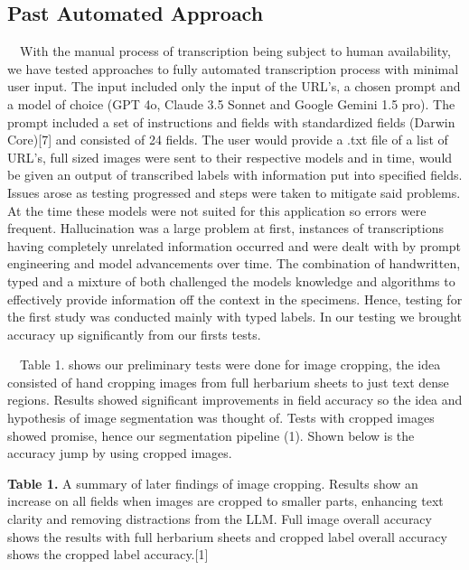 \documentclass{article}
\begin{document}
\subsection{Past Automated Approach}
$\quad$With the manual process of transcription being subject to human availability, we have tested approaches to fully automated transcription process with minimal user input. The input included only the input of the URL's, a chosen prompt and a model of choice (GPT 4o, Claude 3.5 Sonnet and Google Gemini 1.5 pro). The prompt included a set of instructions and fields with standardized fields (Darwin Core)[7] and consisted of 24 fields. The user would provide a .txt file of a list of URL's, full sized images were sent to their respective models and in time, would be given an output of transcribed labels with information put into specified fields. Issues arose as testing progressed and steps were taken to mitigate said problems. At the time these models were not suited for this application so errors were frequent. Hallucination was a large problem at first, instances of transcriptions having completely unrelated information occurred and were dealt with by prompt engineering and model advancements over time. The combination of handwritten, typed and a mixture of both challenged the models knowledge and algorithms to effectively provide information off the context in the specimens. Hence, testing for the first study was conducted mainly with typed labels. In our testing we brought accuracy up significantly from our firsts tests. 

$\quad$Table 1. shows our preliminary tests were done for image cropping, the idea consisted of hand cropping images from full herbarium sheets to just text dense regions. Results showed significant improvements in field accuracy so the idea and hypothesis of image segmentation was thought of. Tests with cropped images showed promise, hence our segmentation pipeline (1). Shown below is the accuracy jump by using cropped images.

\noindent\textbf{Table 1.} A summary of later findings of image cropping. Results show an increase on all fields when images are cropped to smaller parts, enhancing text clarity and removing distractions from the LLM. Full image overall accuracy shows the results with full herbarium sheets and cropped label overall accuracy shows the cropped label accuracy.[1]
\end{document}
